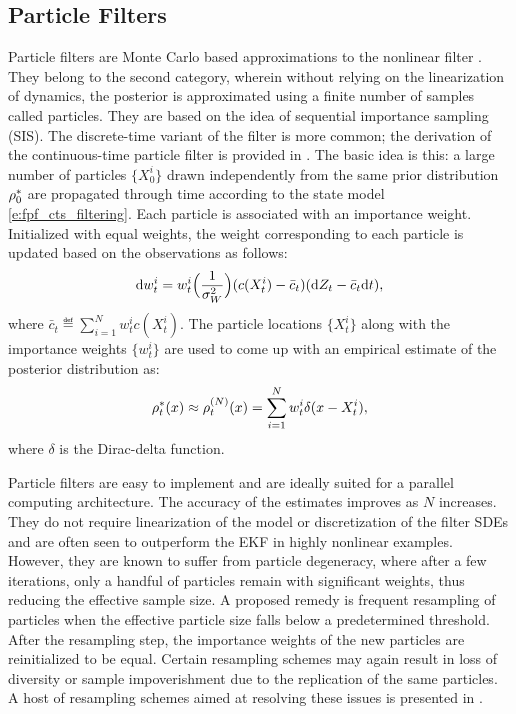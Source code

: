 \subsection{Particle Filters}
\label{e:fpf_particle}
Particle filters are Monte Carlo based approximations to the nonlinear filter \cite{doucet2000sequential}. They belong to the second category, wherein without relying on the linearization of dynamics, the posterior is approximated using a finite number of samples called particles. They are based on the idea of sequential importance sampling (SIS). The discrete-time variant of the filter is more common; the derivation of the continuous-time particle filter is provided in \cite{kutsurpfi19}. The basic idea is this: a large number of particles $\{X^i_0\}$ drawn independently from the same prior distribution $\rho^*_0$ are propagated through time according to the state model \eqref{e:fpf_cts_filtering}. Each particle is associated with an importance weight. Initialized with equal weights, the weight corresponding to each particle is updated based on the observations as follows:
\begin{equation}
\ud w^i_t = w^i_t  \Bigl(\frac{1}{\sigma^2_W} \Bigr) (c(X^i_t)  - \bar{c}_t ) (\ud Z_t - \bar{c}_t \ud t),
\label{e:fpf_particle_wt}
\end{equation}
where $\bar{c}_t \eqdef \sum_{i=1}^N w^i_t c(X^i_t)$. The particle locations $\{X^i_t\}$ along with the importance weights $\{w^i_t\}$ are used to come up with an empirical estimate of the posterior distribution as:
\begin{equation}
\pr^*_t(x) \approx \pr^{(N)}_t(x) = \sum_{i=1}^N w^i_t \delta(x -X^i_t),
\label{e:fpf_particle_empirical}
\end{equation}
where $\delta$ is the Dirac-delta function. 

Particle filters are easy to implement and are ideally suited for a parallel computing architecture. The accuracy of the estimates improves as $N$ increases. They do not require linearization of the model or discretization of the filter SDEs and are often seen to outperform the EKF in highly nonlinear examples. However, they are known to suffer from particle degeneracy, where after a few iterations, only a handful of particles remain with significant weights, thus reducing the effective sample size. A proposed remedy is frequent resampling of particles when the effective particle size falls below a predetermined threshold. After the resampling step, the importance weights of the new particles are reinitialized to be equal. Certain resampling schemes may again result in loss of diversity or sample impoverishment due to the replication of the same particles. A host of resampling schemes aimed at resolving these issues is presented in \cite{budchelee07, arumasgorcla02}.
 
